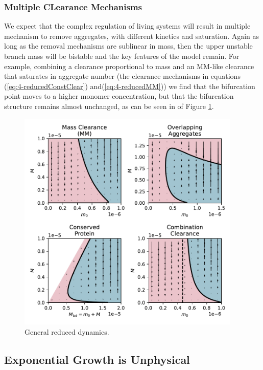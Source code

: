 \subsubsection{Multiple CLearance Mechanisms}

We expect that the complex regulation of living systems will result in multiple mechanism to remove aggregates, with different kinetics and saturation. Again as long as the removal mechanisms are sublinear in mass, then the upper unstable branch mass will be bistable and the key features of the model remain. For example, combining a clearance proportional to mass and an MM-like clearance that saturates in aggregate number (the clearance mechanisms in equations (\ref{eq:4-reducedConstClear}) and(\ref{eq:4-reducedMM})) we find that the bifurcation point moves to a higher monomer concentration, but that the bifurcation structure remains almost unchanged, as can be seen in  of Figure \ref{fig:4-generalReduced}.

\begin{figure}
    \centering
    \includegraphics[width=0.95\textwidth]{figures/4-agg-figs/generalisingReduced_nocol.pdf}
    \caption{General reduced dynamics.}
    \label{fig:4-generalReduced}
\end{figure}

\subsection{Exponential Growth is Unphysical}

